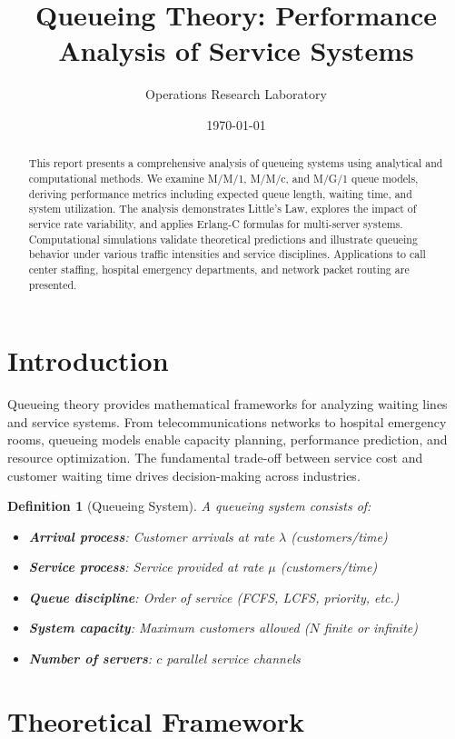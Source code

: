 \documentclass[a4paper, 11pt]{article}
\title{Queueing Theory: Performance Analysis of Service Systems}
\author{Operations Research Laboratory}
\date{\today}
\newtheorem{definition}{Definition}[section]
\begin{document}
\maketitle

\begin{abstract}
This report presents a comprehensive analysis of queueing systems using analytical and computational methods. We examine M/M/1, M/M/c, and M/G/1 queue models, deriving performance metrics including expected queue length, waiting time, and system utilization. The analysis demonstrates Little's Law, explores the impact of service rate variability, and applies Erlang-C formulas for multi-server systems. Computational simulations validate theoretical predictions and illustrate queueing behavior under various traffic intensities and service disciplines. Applications to call center staffing, hospital emergency departments, and network packet routing are presented.
\end{abstract}

\section{Introduction}

Queueing theory provides mathematical frameworks for analyzing waiting lines and service systems. From telecommunications networks to hospital emergency rooms, queueing models enable capacity planning, performance prediction, and resource optimization. The fundamental trade-off between service cost and customer waiting time drives decision-making across industries.

\begin{definition}[Queueing System]
A queueing system consists of:
\begin{itemize}
\item \textbf{Arrival process}: Customer arrivals at rate $\lambda$ (customers/time)
\item \textbf{Service process}: Service provided at rate $\mu$ (customers/time)
\item \textbf{Queue discipline}: Order of service (FCFS, LCFS, priority, etc.)
\item \textbf{System capacity}: Maximum customers allowed ($N$ finite or infinite)
\item \textbf{Number of servers}: $c$ parallel service channels
\end{itemize}
\end{definition}

\section{Theoretical Framework}
\end{document}
